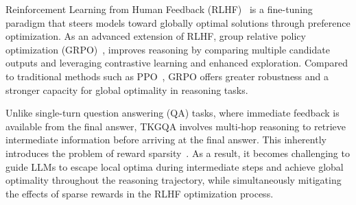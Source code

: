 \documentclass[letterpaper]{article} %
\begin{document}
Reinforcement Learning from Human Feedback (RLHF)~\cite{DPO, PPO} is a fine-tuning paradigm that steers models toward globally optimal solutions through preference optimization. 
As an advanced extension of RLHF, group relative policy optimization (GRPO)~\cite{guo2025deepseek}, improves reasoning by comparing multiple candidate outputs and leveraging contrastive learning and enhanced exploration. Compared to traditional methods such as PPO~\cite{PPO}, GRPO offers greater robustness and a stronger capacity for global optimality in reasoning tasks.

Unlike single-turn question answering (QA) tasks, where immediate feedback is available from the final answer, TKGQA involves multi-hop reasoning to retrieve intermediate information before arriving at the final answer. This inherently introduces the problem of reward sparsity~\cite{sparse1, sparse2, sparse3}. As a result, it becomes challenging to guide LLMs to escape local optima during intermediate steps and achieve global optimality throughout the reasoning trajectory, while simultaneously mitigating the effects of sparse rewards in the RLHF optimization process.


\end{document}
